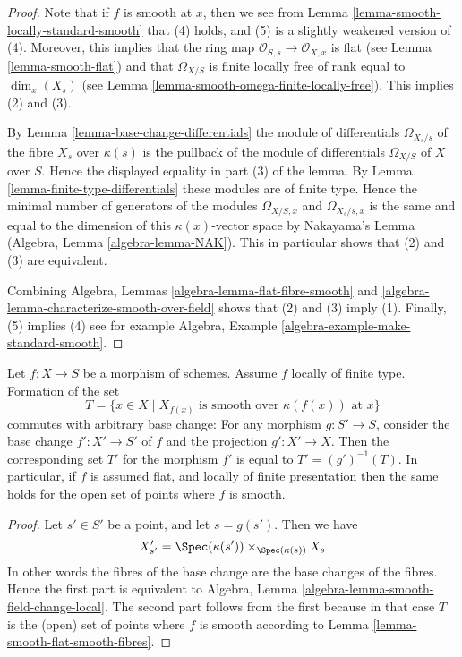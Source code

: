 \begin{proof}
Note that if $f$ is smooth at $x$, then we see from Lemma
\ref{lemma-smooth-locally-standard-smooth} that (4) holds, and (5) is a slightly
weakened version of (4). Moreover, this implies that the ring
map $\mathcal{O}_{S, s} \to \mathcal{O}_{X, x}$ is flat (see
Lemma \ref{lemma-smooth-flat}) and that $\Omega_{X/S}$ is
finite locally free of rank equal to
$\dim_x(X_s)$ (see Lemma \ref{lemma-smooth-omega-finite-locally-free}).
This implies (2) and (3).

\medskip\noindent
By Lemma \ref{lemma-base-change-differentials}
the module of differentials $\Omega_{X_s/s}$ of the fibre $X_s$
over $\kappa(s)$ is the pullback of the module of differentials
$\Omega_{X/S}$ of $X$ over $S$. Hence the displayed equality in
part (3) of the lemma. By Lemma \ref{lemma-finite-type-differentials}
these modules are of finite type. Hence the minimal number of
generators of the modules
$\Omega_{X/S, x}$ and $\Omega_{X_s/s, x}$ is the same and equal to the
dimension of this $\kappa(x)$-vector space by Nakayama's Lemma
(Algebra, Lemma \ref{algebra-lemma-NAK}). This in particular shows that
(2) and (3) are equivalent.

\medskip\noindent
Combining Algebra, Lemmas \ref{algebra-lemma-flat-fibre-smooth} and
\ref{algebra-lemma-characterize-smooth-over-field} shows that
(2) and (3) imply (1). Finally, (5) implies (4) see for example
Algebra, Example \ref{algebra-example-make-standard-smooth}.
\end{proof}

\begin{lemma}
\label{lemma-set-points-where-fibres-smooth}
Let $f : X \to S$ be a morphism of schemes.
Assume $f$ locally of finite type. Formation of the set
$$
T = \{x \in X \mid
X_{f(x)}\text{ is smooth over }\kappa(f(x))\text{ at }x\}
$$
commutes with arbitrary base change:
For any morphism $g : S' \to S$, consider
the base change $f' : X' \to S'$ of $f$ and the
projection $g' : X' \to X$. Then the corresponding
set $T'$ for the morphism $f'$ is equal to $T' = (g')^{-1}(T)$.
In particular, if $f$ is assumed flat, and locally of finite
presentation then the same holds for the open set of points
where $f$ is smooth.
\end{lemma}

\begin{proof}
Let $s' \in S'$ be a point, and let $s = g(s')$. Then we have
$$
X'_{s'} =
\Spec(\kappa(s')) \times_{\Spec(\kappa(s))} X_s
$$
In other words the fibres of the base change are the base changes
of the fibres. Hence the first part is equivalent to
Algebra, Lemma \ref{algebra-lemma-smooth-field-change-local}.
The second part follows from the first because in that case
$T$ is the (open) set of points where $f$ is smooth according to
Lemma \ref{lemma-smooth-flat-smooth-fibres}.
\end{proof}


